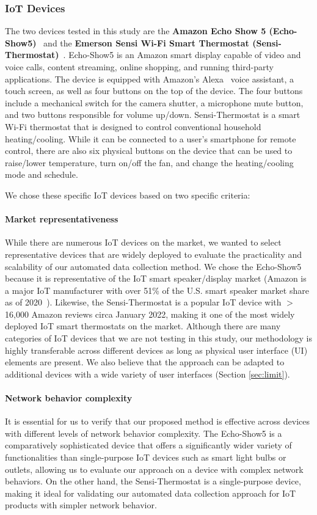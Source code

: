 \subsubsection{IoT Devices}The two devices tested in this study are the \textbf{Amazon Echo Show 5 (Echo-Show5)}~\cite{echo} and the \textbf{Emerson Sensi Wi-Fi Smart Thermostat (Sensi-Thermostat)}~\cite{sensi}. Echo-Show5 is an Amazon smart display capable of video and voice calls, content streaming, online shopping, and running third-party applications. The device is equipped with Amazon's Alexa~\cite{alexa} voice assistant, a touch screen, as well as four buttons on the top of the device. The four buttons include a mechanical switch for the camera shutter, a microphone mute button, and two buttons responsible for volume up/down. Sensi-Thermostat is a smart Wi-Fi thermostat that is designed to control conventional household heating/cooling. While it can be connected to a user's smartphone for remote control, there are also six physical buttons on the device that can be used to raise/lower temperature, turn on/off the fan, and change the heating/cooling mode and schedule.

We chose these specific IoT devices based on two specific criteria:

\paragraph{Market representativeness} While there are numerous IoT devices on the market, we wanted to select representative devices that are widely deployed to evaluate the practicality
and scalability of our automated data collection method. We chose the Echo-Show5 because it is representative of the IoT smart speaker/display market (Amazon is a major IoT manufacturer with over 51\% of the U.S. smart speaker market share as of 2020~\cite{amazon_data}). Likewise, the Sensi-Thermostat is a popular IoT device with $>$16,000 Amazon reviews circa January 2022, making it one of the most widely deployed IoT smart thermostats on the market. Although there are many categories of IoT devices that we are not testing in this study, our methodology is highly transferable
across different devices as long as physical user interface (UI) elements are present. We also believe that the approach can be adapted to additional devices with
a wide variety of user interfaces (Section \ref{sec:limit}).

\paragraph{Network behavior complexity} It is essential for us to verify that our proposed method is effective across devices with different levels of network behavior complexity. 
The Echo-Show5 is a comparatively sophisticated device that offers a significantly wider variety of functionalities than single-purpose IoT devices such as smart light bulbs or outlets, allowing us to evaluate our approach on a device with complex network behaviors. On the other hand, the Sensi-Thermostat is a single-purpose device, making it ideal for validating our automated data collection approach for IoT products with simpler network behavior.

